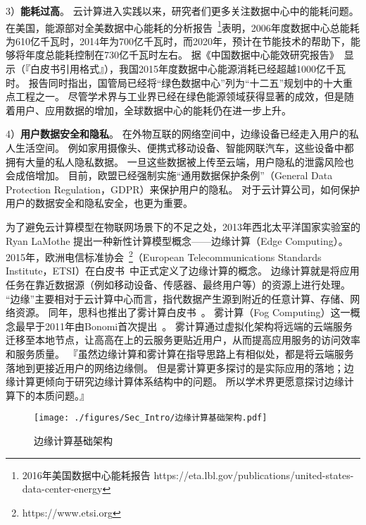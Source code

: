 3）\textbf{能耗过高}。
云计算进入实践以来，研究者们更多关注数据中心中的能耗问题。
在美国，能源部对全美数据中心能耗的分析报告~\footnote{2016年美国数据中心能耗报告 https://eta.lbl.gov/publications/united-states-data-center-energy}表明，2006年度数据中心总能耗为610亿千瓦时，2014年为700亿千瓦时，而2020年，预计在节能技术的帮助下，能够将年度总能耗控制在730亿千瓦时左右。
据《中国数据中心能效研究报告》~\cite{whitebooks/cn15}显示（『白皮书引用格式』），我国2015年度数据中心能源消耗已经超越1000亿千瓦时。
报告同时指出，国管局已经将“绿色数据中心”列为“十二五”规划中的十大重点工程之一。
尽管学术界与工业界已经在绿色能源领域获得显著的成效，但是随着用户、应用数据的增加，全球数据中心的能耗仍在进一步上升。

4）\textbf{用户数据安全和隐私}。
在外物互联的网络空间中，边缘设备已经走入用户的私人生活空间。
例如家用摄像头、便携式移动设备、智能网联汽车，这些设备中都拥有大量的私人隐私数据。
一旦这些数据被上传至云端，用户隐私的泄露风险也会成倍增加。
目前，欧盟已经强制实施“通用数据保护条例”（General Data Protection Regulation，GDPR）来保护用户的隐私。
对于云计算公司，如何保护用户的数据安全和隐私安全，也更为重要。

为了避免云计算模型在物联网场景下的不足之处，2013年西北太平洋国家实验室的 Ryan LaMothe 提出一种新性计算模型概念——边缘计算（Edge Computing）。
2015年，欧洲电信标准协会~\footnote{https://www.etsi.org}（European Telecommunications Standards Institute，ETSI）在白皮书~\cite{hu2015mobile}中正式定义了边缘计算的概念。
边缘计算就是将应用任务在靠近数据源（例如移动设备、传感器、最终用户等）的资源上进行处理。
“边缘”主要相对于云计算中心而言，指代数据产生源到附近的任意计算、存储、网络资源。
同年，思科也推出了雾计算白皮书~\cite{computing2015internet}。
雾计算（Fog Computing）这一概念最早于2011年由Bonomi首次提出~\cite{bonomi2011connected}。
雾计算通过虚拟化架构将远端的云端服务迁移至本地节点，让高高在上的云服务更贴近用户，从而提高应用服务的访问效率和服务质量。
『虽然边缘计算和雾计算在指导思路上有相似处，都是将云端服务落地到更接近用户的网络边缘侧。
但是雾计算更多探讨的是实际应用的落地；边缘计算更倾向于研究边缘计算体系结构中的问题。
所以学术界更愿意探讨边缘计算下的本质问题。』

\begin{figure}[!h]
  \centering
  \texttt{[image: ./figures/Sec\_Intro/边缘计算基础架构.pdf]}
  \vspace{-0.5em}
  \caption{边缘计算基础架构}
  \label{Figure_EC_Architecture}
\end{figure}

